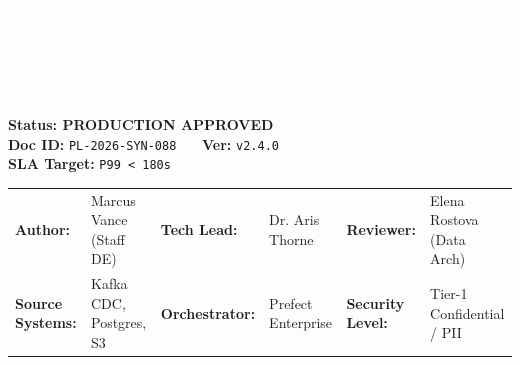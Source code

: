 \documentclass[10pt, a4paper]{article}
\begin{document}
\begin{tcolorbox}[enhanced, colback=PrimaryBlue, colframe=PrimaryBlue, arc=3pt, boxsep=6pt, left=8pt, right=8pt, top=6pt, bottom=6pt]
\begin{minipage}[t]{0.65\textwidth}
    \textcolor{white}{\scriptsize \textbf{NEXA ENTERPRISE DATA PLATFORM} \ \textbar\ \ TECHNICAL ARCHITECTURE SPECIFICATION}\\[2pt]
    \textcolor{white}{\Large \bfseries Synapse Real-Time Order \& Telemetry ETL Pipeline} \\[4pt]
    \textcolor{white}{\scriptsize \faDatabase\ \textbf{Target Warehouse:} Meridian Snowflake Data Lakehouse \ \textbar\ \ \faServer\ \textbf{Engine:} Apache Spark + dbt Core}
\end{minipage}%
\hfill
\begin{minipage}[t]{0.32\textwidth}
    \raggedleft
    \begin{tcolorbox}[colback=white, colframe=AccentTeal, arc=2pt, boxsep=2pt, left=4pt, right=4pt, top=3pt, bottom=3pt]
        \centering
        \scriptsize \textcolor{PrimaryBlue}{\textbf{Status: PRODUCTION APPROVED}} \\[1pt]
        \tiny \textcolor{DarkText}{\textbf{Doc ID:} \texttt{PL-2026-SYN-088}} \ \textbar\ \ \textbf{Ver:} \texttt{v2.4.0} \\
        \tiny \textcolor{DarkText}{\textbf{SLA Target:} \texttt{P99 < 180s}}
    \end{tcolorbox}
\end{minipage}
\end{tcolorbox}

\vspace{2pt}

\begin{tcolorbox}[cardbox]
\scriptsize
\begin{tabularx}{\textwidth}{@{}lXlXlX@{}}
\textbf{Author:} & Marcus Vance (Staff DE) & \textbf{Tech Lead:} & Dr. Aris Thorne & \textbf{Reviewer:} & Elena Rostova (Data Arch) \\
\textbf{Source Systems:} & Kafka CDC, Postgres, S3 & \textbf{Orchestrator:} & Prefect Enterprise & \textbf{Security Level:} & Tier-1 Confidential / PII \\
\end{tabularx}
\end{tcolorbox}
\end{document}

